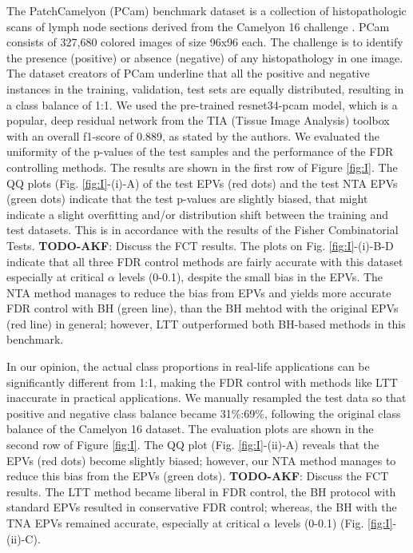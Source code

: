\documentclass{article}
\newcommand{\todo}[2]{{\color{red} {\bf TODO-#1}: #2}}
\begin{document}
The PatchCamelyon (PCam) benchmark dataset is a collection of histopathologic scans of lymph node sections \cite{Veeling2018-qh} derived from the Camelyon 16 challenge \cite{camelyon16}. PCam consists of 327,680 colored images of size 96x96 each. The challenge is to identify the presence (positive) or absence (negative) of any histopathology in one image. The dataset creators of PCam underline that all the positive and negative instances in the training, validation, test sets are equally distributed, resulting in a class balance of 1:1. We used the pre-trained resnet34-pcam model, which is a popular, deep residual network from the TIA (Tissue Image Analysis) toolbox \cite{Pocock2022} with an overall f1-score of 0.889, as stated by the authors. We evaluated the uniformity of the p-values of the test samples and the performance of the FDR controlling methods. The results are shown in the first row of Figure \ref{fig:I}.  The QQ plots (Fig. \ref{fig:I}-(i)-A) of the test EPVs (red dots) and the test NTA EPVs (green dots) indicate that the test p-values are slightly biased, that might indicate a slight overfitting and/or distribution shift between the training and test datasets. This is in accordance with the results of the Fisher Combinatorial Tests. \todo{AKF}{Discuss the FCT results.} The plots on Fig. \ref{fig:I}-(i)-B-D indicate that all three FDR control methods are fairly accurate with this dataset especially at critical $\alpha$ levels (0-0.1), despite the small bias in the EPVs. The NTA method manages to reduce the bias from EPVs and yields more accurate FDR control with BH (green line), than the BH mehtod with the original EPVs (red line) in general; however, LTT outperformed both BH-based methods in this benchmark. 

In our opinion, the actual class proportions in real-life applications can be significantly different from 1:1, making the FDR control with methods like LTT inaccurate in practical applications. We manually resampled the test data so that  positive and negative class balance became 31\%:69\%, following the original class balance of the Camelyon 16 dataset. The evaluation plots are shown in the second row of Figure \ref{fig:I}. The QQ plot (Fig. \ref{fig:I}-(ii)-A) reveals that the EPVs (red dots) become slightly biased; however, our NTA method manages to reduce this bias from the EPVs (green dots). \todo{AKF}{Discuss the FCT results.}  The LTT method became liberal in FDR control, the BH protocol with standard EPVs resulted in conservative FDR control; whereas, the BH with the TNA EPVs remained accurate, especially at critical $\alpha$ levels (0-0.1) (Fig. \ref{fig:I}-(ii)-C).
\end{document}
